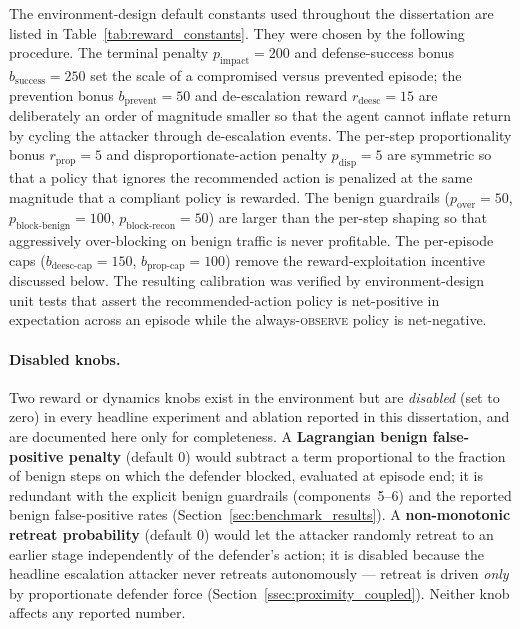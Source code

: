 The environment-design default constants used throughout the dissertation are listed in Table~\ref{tab:reward_constants}. They were chosen by the following procedure. The terminal penalty $p_{\mathrm{impact}} = 200$ and defense-success bonus $b_{\mathrm{success}} = 250$ set the scale of a compromised versus prevented episode; the prevention bonus $b_{\mathrm{prevent}} = 50$ and de-escalation reward $r_{\mathrm{deesc}} = 15$ are deliberately an order of magnitude smaller so that the agent cannot inflate return by cycling the attacker through de-escalation events. The per-step proportionality bonus $r_{\mathrm{prop}} = 5$ and disproportionate-action penalty $p_{\mathrm{disp}} = 5$ are symmetric so that a policy that ignores the recommended action is penalized at the same magnitude that a compliant policy is rewarded. The benign guardrails ($p_{\mathrm{over}} = 50$, $p_{\mathrm{block\text{-}benign}} = 100$, $p_{\mathrm{block\text{-}recon}} = 50$) are larger than the per-step shaping so that aggressively over-blocking on benign traffic is never profitable. The per-episode caps ($b_{\mathrm{deesc\text{-}cap}} = 150$, $b_{\mathrm{prop\text{-}cap}} = 100$) remove the reward-exploitation incentive discussed below. The resulting calibration was verified by environment-design unit tests that assert the recommended-action policy is net-positive in expectation across an episode while the always-\textsc{observe} policy is net-negative.

\paragraph{Disabled knobs.} Two reward or dynamics knobs exist in the environment but are \emph{disabled} (set to zero) in every headline experiment and ablation reported in this dissertation, and are documented here only for completeness. A \textbf{Lagrangian benign false-positive penalty} (default $0$) would subtract a term proportional to the fraction of benign steps on which the defender blocked, evaluated at episode end; it is redundant with the explicit benign guardrails (components~5--6) and the reported benign false-positive rates (Section~\ref{sec:benchmark_results}). A \textbf{non-monotonic retreat probability} (default $0$) would let the attacker randomly retreat to an earlier stage independently of the defender's action; it is disabled because the headline escalation attacker never retreats autonomously --- retreat is driven \emph{only} by proportionate defender force (Section~\ref{ssec:proximity_coupled}). Neither knob affects any reported number.


